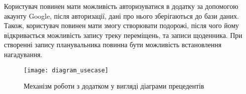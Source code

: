 \documentclass[../main.tex]{subfiles}
\begin{document}
Користувач повинен мати можливість авторизуватися в додатку за допомогою акаунту Google, після авторизації, дані про нього зберігаються до бази даних. Також, користувач повинен мати змогу створювати подорожі, після чого йому відкривається можливість запису треку переміщень, та записи щоденника. При створенні запису планувальника повинна бути можливість встановлення нагадування.

\begin{figure}[H]
	\centering
	\texttt{[image: diagram\_usecase]}
	\caption{Механізм роботи з додатком у вигляді діаграми прецедентів}
	\label{diagram:usecase}
\end{figure}


\end{document}
